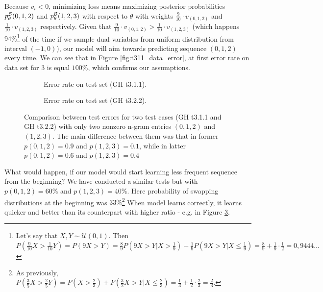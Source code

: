 \documentclass[declaration,shortabstract,lic,english]{iithesis}
\begin{document}
Because $v_i < 0$, minimizing loss means maximizing posterior probabilities $p_\theta^\mathcal{B}(0,1,2)$ and $p_\theta^\mathcal{B}(1,2,3)$ with respect to $\theta$ with weights $\frac{9}{10} \cdot v_{(0, 1, 2)}$ and $\frac{1}{10}\cdot v_{(1, 2, 3)}$ respectively. Given that $\frac{9}{10} \cdot v_{(0, 1, 2)} > \frac{1}{10}\cdot v_{(1, 2, 3)}$ (which happens $94\%$\footnote{Let's say that $X, Y \sim \mathcal{U}(0,1)$. Then $P\left(\frac{9}{10}X > \frac{1}{10}Y\right) = P\left(9X > Y\right) = \frac{8}{9}P\left(9X > Y | X > \frac{1}{9}\right) + \frac{1}{9}P\left(9X > Y | X \le \frac{1}{9}\right) = \frac{8}{9} + \frac{1}{9}\cdot\frac{1}{2} = 0,9444\dots$}
of the time if we sample dual variables from uniform distribution from interval $(-1, 0)$), our model will aim towards predicting sequence $(0,1,2)$ every time. We can see that in Figure \ref{fig:t311_data_error}, at first error rate on data set for $3$ is equal $100\%$, which confirms our assumptions. 

\begin{figure}[htb]
\begin{subfigure}[b]{.49\textwidth}
    \def\svgwidth{\textwidth}
    
    \caption{Error rate on test set (GH t3.1.1).}
    \label{fig:t311_test_error_comp}
\end{subfigure}
\begin{subfigure}[b]{.49\textwidth}
    \def\svgwidth{\textwidth}
    
    \caption{Error rate on test set (GH t3.2.2).}
    \label{fig:t322_test_error_comp}
\end{subfigure}
\caption{Comparison between test errors for two test cases (GH t3.1.1 and GH t3.2.2) with only two nonzero n-gram entries $(0,1,2)$ and $(1,2,3)$. The main difference between them was that in former $p(0,1,2) = 0.9$ and $p(1,2,3) = 0.1$, while in latter $p(0,1,2) = 0.6$ and $p(1,2,3) = 0.4$}
\label{fig:t311_t322_test_error_comp}
\end{figure}

What would happen, if our model would start learning less frequent sequence from the beginning? We have conducted a similar tests but with $p(0,1,2)=60\%$ and $p(1,2,3)=40\%$. Here probability of swapping distributions at the beginning was $33\%$\footnote{As previously, $P(\frac{3}{5}X>\frac{2}{5}Y) = P(X>\frac{2}{3}) + P(\frac{3}{2}X>Y|X\le\frac{2}{3})=\frac{1}{3} + \frac{1}{2}\cdot\frac{2}{3} = \frac{2}{3}$.} When model learns correctly, it learns quicker and better than its counterpart with higher ratio - e.g. in Figure \ref{fig:t311_t322_test_error_comp}.
\end{document}
